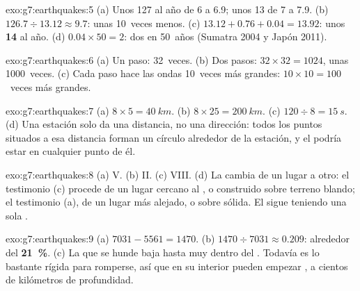 \begin{solution}{exo:g7:earthquakes:5}
(a) Unos 127 al año de  6 a 6.9; unos 13 de  7 a 7.9.
(b) $126.7 \div 13.12 \approx 9.7$: unas 10~veces menos. (c)
$13.12 + 0.76 + 0.04 = 13.92$: unos \textbf{14} al año. (d)
$0.04 \times 50 = 2$: dos en 50~años (Sumatra 2004 y Japón 2011).
\end{solution}

\begin{solution}{exo:g7:earthquakes:6}
(a) Un paso: 32~veces. (b) Dos pasos: $32 \times 32 = 1024$, unas
1000~veces. (c) Cada paso hace las ondas 10~veces más grandes: $10 \times 10 =
100$~veces más grandes.
\end{solution}

\begin{solution}{exo:g7:earthquakes:7}
(a) $8 \times 5 = \qty{40}{km}$. (b) $8 \times 25 = \qty{200}{km}$. (c)
$120 \div 8 = \qty{15}{s}$. (d) Una estación solo da una distancia, no una
dirección: todos los puntos situados a esa distancia forman un círculo
alrededor de la estación, y el  podría estar en cualquier punto
de él.
\end{solution}

\begin{solution}{exo:g7:earthquakes:8}
(a) V. (b) II. (c) VIII. (d) La  cambia de un lugar a otro: el
testimonio (c) procede de un lugar cercano al , o construido sobre
terreno blando; el testimonio (a), de un lugar más alejado, o sobre 
sólida. El  sigue teniendo una sola .
\end{solution}

\begin{solution}{exo:g7:earthquakes:9}
(a) $7031 - 5561 = 1470$. (b) $1470 \div 7031 \approx 0.209$: alrededor
del \textbf{21~\%}. (c) La  que se hunde baja hasta muy dentro del
. Todavía es lo bastante rígida para romperse, así que en su interior
pueden empezar , a cientos de kilómetros de profundidad.
\end{solution}

